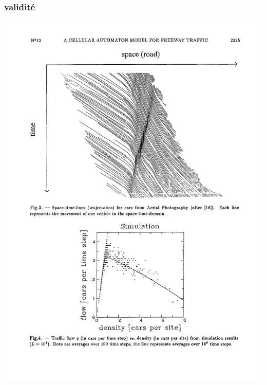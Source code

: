 \documentclass[slidetop,11pt]{beamer}
\begin{document}
\begin{frame}
\frametitle{validité}
\includegraphics[scale = 0.7]{./images/dfondcomp}

\end{frame}
\end{document}
